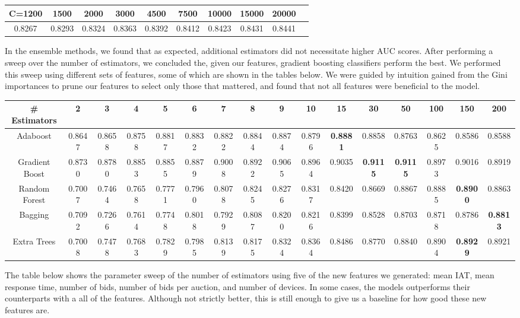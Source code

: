 \documentclass{article} %
\begin{document}
\begin{adjustbox}{width=\textwidth,totalheight=\textheight,keepaspectratio}
\begin{tabular}{cccccccccc}
C=1200 & 1500 & 2000 & 3000 & 4500 & 7500 & 10000 & 15000 & 20000\\
\hline
 0.8267 & 0.8293 & 0.8324 & 0.8363 & 0.8392 & 0.8412 & 0.8423 & 0.8431 & 0.8441
\end{tabular}
\end{adjustbox}

In the ensemble methods, we found that as expected, additional estimators did
not necessitate higher AUC scores. After performing a sweep over the number of
estimators, we concluded the, given our features, gradient boosting classifiers
perform the best. We performed this sweep using different sets of features, some
of which are shown in the tables below. We were guided by intuition gained from the Gini
importances to prune our features to select only those that mattered, and found
that not all features were beneficial to the model.

\begin{adjustbox}{width=\textwidth,totalheight=\textheight,keepaspectratio}
\begin{tabular}{c | c c c c c c c c c c c c c c c}
\# Estimators & 2 & 3 & 4 & 5 & 6 & 7 & 8 & 9 & 10 & 15 & 30 & 50 & 100 & 150 & 200\\
\hline
Adaboost & 0.8647 & 0.8658 & 0.8758 & 0.8817 & 0.8832 & 0.8822 & 0.8844 & 0.8874 & 0.8796 & \textbf{0.8881} & 0.8858 & 0.8763 & 0.8625 & 0.8586 & 0.8588\\
Gradient Boost & 0.8730 & 0.8780 & 0.8853 & 0.8855 & 0.8879 & 0.9008 & 0.8922 & 0.9065 & 0.8964 & 0.9035 & \textbf{0.9115} & \textbf{0.9115} & 0.8973 & 0.9016 & 0.8919\\
Random Forest & 0.7007 & 0.7464 & 0.7658 & 0.7771 & 0.7960 & 0.8078 & 0.8245 & 0.8276 & 0.8317 & 0.8420 & 0.8669 & 0.8867 & 0.8885 & \textbf{0.8900} & 0.8863\\
Bagging & 0.7092 & 0.7266 & 0.7614 & 0.7748 & 0.8018 & 0.7929 & 0.8087 & 0.8200 & 0.8216 & 0.8399 & 0.8528 & 0.8703 & 0.8718 & 0.8786 & \textbf{0.8813}\\
Extra Trees & 0.7008 & 0.7478 & 0.7683 & 0.7829 & 0.7985 & 0.8139 & 0.8175 & 0.8324 & 0.8364 & 0.8486 & 0.8770 & 0.8840 & 0.8904 & \textbf{0.8929} & 0.8921
\end{tabular}
\end{adjustbox}


The table below shows the parameter sweep of the number of estimators using five
of the new features we generated: mean IAT, mean response time, number of bids,
number of bids per auction, and number of devices. In some cases, the models
outperforms their counterparts with a all of the features. Although not strictly
better, this is still enough to give us a baseline for how good these new features are.
\end{document}
